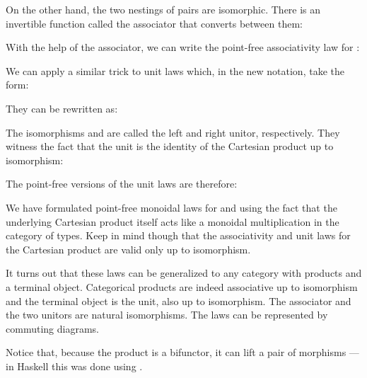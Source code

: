 On the other hand, the two nestings of pairs are isomorphic. There is an
invertible function called the associator that converts between them:

With the help of the associator, we can write the point-free
associativity law for :

We can apply a similar trick to unit laws which, in the new notation,
take the form:

They can be rewritten as:

The isomorphisms  and  are called the left
and right unitor, respectively. They witness the fact that the unit
\code{()} is the identity of the Cartesian product up to isomorphism:


The point-free versions of the unit laws are therefore:

We have formulated point-free monoidal laws for  and
 using the fact that the underlying Cartesian product itself
acts like a monoidal multiplication in the category of types. Keep in
mind though that the associativity and unit laws for the Cartesian
product are valid only up to isomorphism.

It turns out that these laws can be generalized to any category with
products and a terminal object. Categorical products are indeed
associative up to isomorphism and the terminal object is the unit, also
up to isomorphism. The associator and the two unitors are natural
isomorphisms. The laws can be represented by commuting diagrams.

\begin{figure}[H]
\centering
{}
\end{figure}

\noindent
Notice that, because the product is a bifunctor, it can lift a pair of
morphisms --- in Haskell this was done using .

